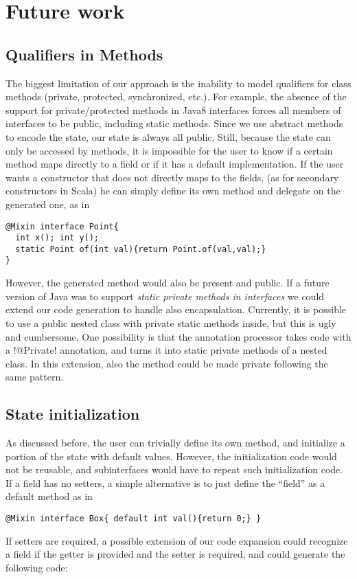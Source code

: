 \section{Future work}\label{sec:futurework}

\subsection{Qualifiers in Methods} %
The biggest limitation of our approach is the inability to model qualifiers
for class methods (private, protected, synchronized, etc.). For example, the absence
of the support for private/protected methods in Java8 interfaces forces all
members of interfaces to be public, including static methods. Since we use
abstract methods to encode the state, our state is always all public. Still, because 
the state can only be accessed by methods, it 
is impossible for the user to know if a certain method maps directly to a field
or if it has a default implementation.  If the user wants a constructor that
does not directly maps to the fields, (as for secondary constructors in Scala)
he can simply define its own \Q@of@ method and delegate on the generated one, as
in
\begin{lstlisting}
@Mixin interface Point{
  int x(); int y();
  static Point of(int val){return Point.of(val,val);}  
}
\end{lstlisting}
However, the generated \Q@of@ method would also be present and public.  If a
future version of Java was to support \emph{static private methods in
  interfaces} we could extend our code generation to handle also encapsulation.
Currently, it is possible to use a public nested class with private static
methods inside, but this is ugly and cumbersome. One possibility is that the
annotation processor takes code with a \Q!@Private! annotation, and turns it into
static private methods of a nested class. In this extension, also the \Q@of@
method could be made private following the same pattern.

\subsection{State initialization}
As discussed before, the user can trivially define its own \Q@of@ method, and
initialize a portion of the state with default values.  However, the
initialization code would not be reusable, and subinterfaces would have
to repeat such initialization code.  If a field has no setters, a simple
alternative is to just define the ``field'' as a default method as in
\begin{lstlisting}
@Mixin interface Box{ default int val(){return 0;} }
\end{lstlisting}
If setters are required, a possible extension of our code expansion could
recognize a field if the getter is provided and the setter is required, and
could generate the following code:

